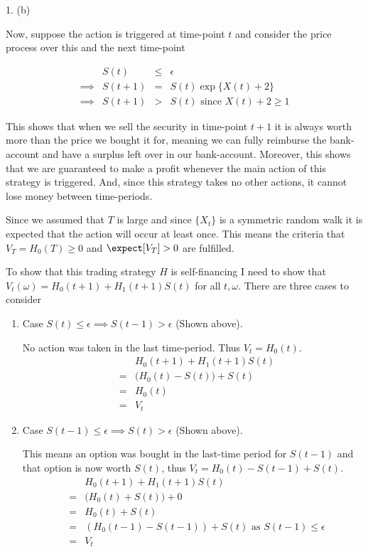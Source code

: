 \documentclass[11pt,a4paper]{article}
\begin{document}
\begin{answer}{1. (b)}
  \par Now, suppose the action is triggered at time-point $t$ and consider the price process over this and the next time-point

  \[\begin{array}{rrcl}
    &S(t)&\leq&\epsilon\\
    \implies&S(t+1)&=&S(t)\exp\{X(t)+2\}\\
    \implies&S(t+1)&>&S(t)\text{ since }X(t)+2\geq1
  \end{array}\]

  This shows that when we sell the security in time-point $t+1$ it is always worth more than the price we bought it for, meaning we can fully reimburse the bank-account and have a surplus left over in our bank-account. Moreover, this shows that we are guaranteed to make a profit whenever the main action of this strategy is triggered. And, since this strategy takes no other actions, it cannot lose money between time-periods.
  \par Since we assumed that $T$ is large and since $\{X_t\}$ is a symmetric random walk it is expected that the action will occur at least once. This means the criteria that $V_T=H_0(T)\geq0$ and $\expect[V_T]>0$ are fulfilled.

  \par To show that this trading strategy $H$ is self-financing I need to show that $V_t(\omega)=H_0(t+1)+H_1(t+1)S(t)$ for all $t,\omega$. There are three cases to consider
  \begin{enumerate}
    \item Case $S(t)\leq\epsilon\implies S(t-1)>\epsilon$ (Shown above).
    \par No action was taken in the last time-period. Thus $V_t=H_0(t)$.
    \[\begin{array}{rcl}
      &&H_0(t+1)+H_1(t+1)S(t)\\
      &=&\big(H_0(t)-S(t)\big)+S(t)\\
      &=&H_0(t)\\
      &=&V_t
    \end{array}\]

    \item Case $S(t-1)\leq\epsilon\implies S(t)>\epsilon$ (Shown above).
    \par This means an option was bought in the last-time period for $S(t-1)$ and that option is now worth $S(t)$, thus $V_t=H_0(t)-S(t-1)+S(t)$.
    \[\begin{array}{rcl}
      &&H_0(t+1)+H_1(t+1)S(t)\\
      &=&\big(H_0(t)+S(t)\big)+0\\
      &=&H_0(t)+S(t)\\
      &=&(H_0(t-1)-S(t-1))+S(t)\text{ as }S(t-1)\leq\epsilon\\
      &=&V_t
    \end{array}\]


\end{enumerate}
\end{answer}
\end{document}
